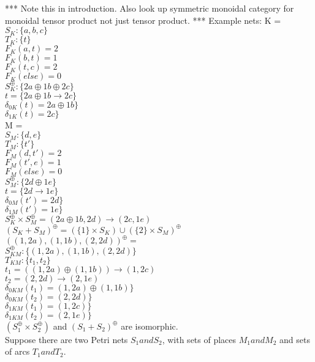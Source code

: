 *** Note this in introduction. Also look up symmetric monoidal category for monoidal tensor product not just tensor product. ***
\newpage
Example nets:
%
K = \\
$S_K :\{ a, b, c\}$\\
$T_K :\{t\}$\\  
$F_K (a, t) = 2$\\
$F_K (b, t) = 1$\\
$F_K (t, c) = 2$\\
$F_K (else) = 0$\\
%
$S_K^\oplus :\{ 2a \oplus 1b \oplus 2c\}$\\
$t = \{ 2a \oplus 1b \to 2c \}$\\  
$\delta_{0K} (t) = 2a \oplus 1b \}$\\
$\delta_{1K} (t) = 2c \}$\\
\smallskip
M = \\
$S_M :\{d,e\}$\\
$T_M :\{t'\}$\\  
$F_M (d, t') = 2$\\
$F_M (t', e) = 1$\\
$F_M (else) = 0$\\
%
$S_M^\oplus :\{ 2d \oplus 1e\}$\\
$t = \{ 2d \to 1e \}$\\  
$\delta_{0M} (t') = 2d \}$\\
$\delta_{1M} (t') = 1e \}$\\
\smallskip
$S_K^\oplus \times S_M^\oplus = (2a \oplus 1b, 2d) \to (2c, 1e)$\\
\smallskip
$(S_K + S_M)^\oplus = (\{1\} \times S_K) \cup (\{2\} \times S_M)^\oplus$\\
$((1, 2a), (1, 1b), (2, 2d))^\oplus = $\\
$S_{KM}^\oplus: \{(1, 2a), (1, 1b), (2, 2d) \}$\\
$T_{KM}: \{t_1, t_2\}$\\
$t_1 = ((1, 2a) \oplus (1, 1b)) \to (1, 2c)$\\
$t_2 = (2, 2d) \to (2, 1e)$\\
$\delta_{0KM} (t_1) = (1, 2a) \oplus (1, 1b) \}$\\
$\delta_{0KM} (t_2) = (2, 2d) \}$\\
$\delta_{1KM} (t_1) = (1, 2c) \}$\\
$\delta_{1KM} (t_2) = (2, 1e) \}$\\
\smallskip
$(S_1 ^\oplus \times S_2 ^\oplus)$ and $(S_1 + S_2)^\oplus$ are isomorphic. \\
Suppose there are two Petri nets $S_1 and S_2$, with sets of places $M_1 and M_2$ and sets of arcs $T_1 and T_2.$\\
